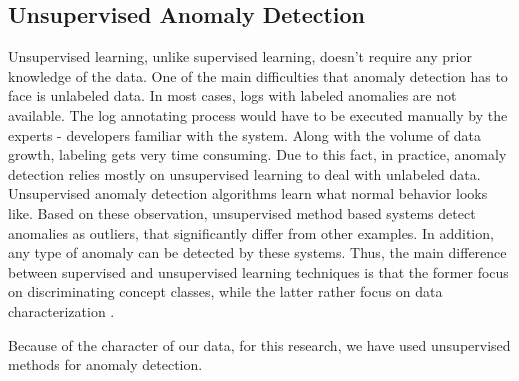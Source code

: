 \subsection{Unsupervised Anomaly Detection}
 Unsupervised learning, unlike supervised learning, doesn't require any prior knowledge of the data. One of the main difficulties that anomaly detection has to face is unlabeled data. In most cases, logs with labeled anomalies are not available. The log annotating process would have to be executed manually by the experts - developers familiar with the system. Along with the volume of data growth, labeling gets very time consuming. Due to this fact, in practice, anomaly detection relies mostly on unsupervised learning to deal with unlabeled data. Unsupervised anomaly detection algorithms learn what normal behavior looks like. Based on these observation, unsupervised method based systems detect anomalies as outliers, that significantly differ from other examples. In addition, any type of anomaly can be detected by these systems. Thus, the main difference between supervised and unsupervised learning techniques is that the former focus on discriminating concept classes, while the latter rather focus on data characterization \cite{Goernitz_2013}. %
 
 Because of the character of our data, for this research, we have used unsupervised methods for anomaly detection.
 
